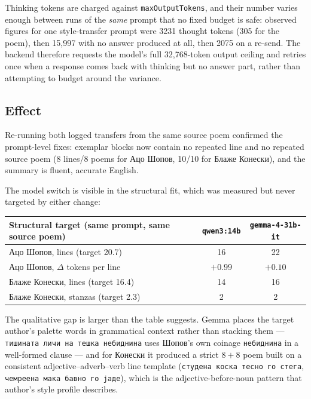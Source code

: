 \documentclass[11pt]{article}
\begin{document}
Thinking tokens are charged against \texttt{maxOutputTokens}, and their number
varies enough between runs of the \emph{same} prompt that no fixed budget is
safe: observed figures for one style-transfer prompt were 3231 thought tokens
(305 for the poem), then 15{,}997 with no answer produced at all, then 2075 on
a re-send. The backend therefore requests the model's full 32{,}768-token
output ceiling and retries once when a response comes back with thinking but no
answer part, rather than attempting to budget around the variance.

\subsection{Effect}

Re-running both logged transfers from the same source poem confirmed the
prompt-level fixes: exemplar blocks now contain no repeated line and no
repeated source poem (8 lines/8 poems for Ацо Шопов, 10/10 for Блаже Конески),
and the summary is fluent, accurate English.

The model switch is visible in the structural fit, which was measured but never
targeted by either change:

\begin{center}
\begin{tabular}{lcc}
\toprule
Structural target (same prompt, same source poem) & \texttt{qwen3:14b} &
\texttt{gemma-4-31b-it} \\
\midrule
Ацо Шопов, lines (target 20.7) & 16 & 22 \\
Ацо Шопов, $\Delta$ tokens per line & $+0.99$ & $+0.10$ \\
Блаже Конески, lines (target 16.4) & 14 & 16 \\
Блаже Конески, stanzas (target 2.3) & 2 & 2 \\
\bottomrule
\end{tabular}
\end{center}

The qualitative gap is larger than the table suggests. Gemma places the target
author's palette words in grammatical context rather than stacking them —
\texttt{тишината личи на тешка небиднина} uses Шопов's own coinage
\texttt{небиднина} in a well-formed clause — and for Конески it produced a
strict $8+8$ poem built on a consistent adjective--adverb--verb line template
(\texttt{студена коска тесно го стега}, \texttt{чемреена мака бавно го јаде}),
which is the adjective-before-noun pattern that author's style profile
describes.
\end{document}
